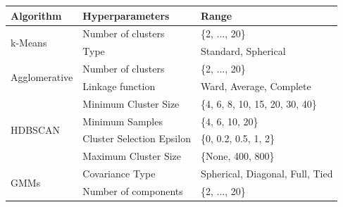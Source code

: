 \begin{tabular}{p{3cm}p{5cm}p{5cm}}
  \toprule
  Algorithm & Hyperparameters & Range \\
  \midrule
  \multirow{2}{*}{k-Means} 
      & Number of clusters & \{2, ..., 20\} \\
      & Type & Standard, Spherical \\
  \midrule
  \multirow{2}{*}{Agglomerative}
      & Number of clusters & \{2, ..., 20\} \\
      & Linkage function & Ward, Average, Complete \\
  \midrule
  \multirow{4}{*}{{HDBSCAN}} 
      & Minimum Cluster Size & \{4, 6, 8, 10, 15, 20, 30, 40\} \\
      & Minimum Samples & \{4, 6, 10, 20\} \\
      & Cluster Selection Epsilon & \{0, 0.2, 0.5, 1, 2\} \\
      & Maximum Cluster Size & \{None, 400, 800\} \\
  \midrule
  \multirow{2}{*}{{GMMs}} 
      & Covariance Type & Spherical, Diagonal, Full, Tied \\
      & Number of components & \{2, ..., 20\} \\
  \bottomrule
  \end{tabular}